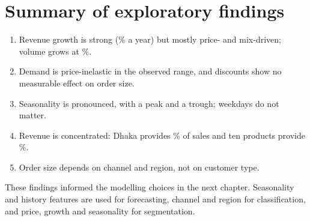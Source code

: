 

\section{Summary of exploratory findings}
\begin{enumerate}
  \item Revenue growth is strong (\CAGRSales\% a year) but mostly price- and mix-driven; volume grows at \CAGRUnits\%.
  \item Demand is price-inelastic in the observed range, and discounts show no measurable effect on order size.
  \item Seasonality is pronounced, with a \PeakMonth peak and a \TroughMonth trough; weekdays do not matter.
  \item Revenue is concentrated: Dhaka provides \DhakaShare\% of sales and ten products provide \TopTenShare\%.
  \item Order size depends on channel and region, not on customer type.
\end{enumerate}
These findings informed the modelling choices in the next chapter. Seasonality and history features are used
for forecasting, channel and region for classification, and price, growth and seasonality for segmentation.
